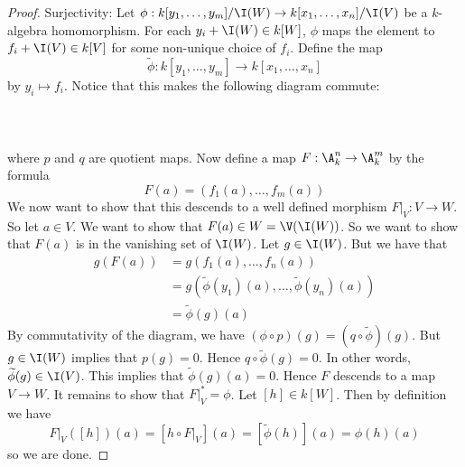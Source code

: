 \documentclass[a4paper]{article}
\begin{document}
\begin{prp}{}{}
\begin{proof}
Surjectivity: Let $\phi:k[y_1,\dots,y_m]/\I(W)\to k[x_1,\dots,x_n]/\I(V)$ be a $k$-algebra homomorphism. For each $y_i+\I(W)\in k[W]$, $\phi$ maps the element to $f_i+\I(V)\in k[V]$ for some non-unique choice of $f_i$. Define the map $$\tilde{\phi}:k[y_1,\dots,y_m]\to k[x_1,\dots,x_n]$$ by $y_i\mapsto f_i$. Notice that this makes the following diagram commute: \\~\\
 \\~\\
where $p$ and $q$ are quotient maps. Now define a map $F:\A_k^n\to\A_k^m$ by the formula $$F(a)=(f_1(a),\dots,f_m(a))$$ We now want to show that this descends to a well defined morphism $F|_V:V\to W$. So let $a\in V$. We want to show that $F(a)\in W=\V(\I(W))$. So we want to show that $F(a)$ is in the vanishing set of $\I(W)$. Let $g\in\I(W)$. But we have that 
\begin{align*}
g(F(a))&=g(f_1(a),\dots,f_n(a))\\
&=g(\widetilde{\phi}(y_1)(a),\dots,\widetilde{\phi}(y_n)(a))\\
&=\widetilde{\phi}(g)(a)
\end{align*}
By commutativity of the diagram, we have $(\phi\circ p)(g)=(q\circ\widetilde{\phi})(g)$. But $g\in\I(W)$ implies that $p(g)=0$. Hence $q\circ\widetilde{\phi}(g)=0$. In other words, $\widetilde{\phi}(g)\in\I(V)$. This implies that $\widetilde{\phi}(g)(a)=0$. Hence $F$ descends to a map $V\to W$. It remains to show that $F|_V^\ast=\phi$. Let $[h]\in k[W]$. Then by definition we have $$F|_V([h])(a)=[h\circ F|_V](a)=[\widetilde{\phi}(h)](a)=\phi(h)(a)$$ so we are done. 
\end{proof}
\end{prp}
\end{document}
